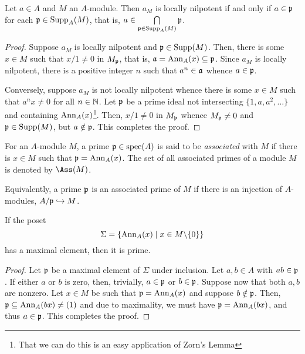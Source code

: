 \begin{proposition}
    Let $a\in A$ and $M$ an $A$-module. Then $a_M$ is locally nilpotent if and only if $a\in\mathfrak p$ for each $\mathfrak p\in\operatorname{Supp}_A(M)$, that is, $a\in\bigcap\limits_{\mathfrak p\in\operatorname{Supp}_A(M)}\mathfrak p$.
\end{proposition}
\begin{proof}
    Suppose $a_M$ is locally nilpotent and $\mathfrak p\in\operatorname{Supp}(M)$. Then, there is some $x\in M$ such that $x/1\ne 0$ in $M_\mathfrak p$, that is, $\mathfrak a = \operatorname{Ann}_A(x)\subseteq\mathfrak p$. Since $a_M$ is locally nilpotent, there is a positive integer $n$ such that $a^n\in\mathfrak a$ whence $a\in\mathfrak p$. 

    Conversely, suppose $a_M$ is not locally nilpotent whence there is some $x\in M$ such that $a^nx\ne0$ for all $n\in\mathbb{N}$. Let $\mathfrak p$ be a prime ideal not intersecting $\{1,a,a^2,\dots\}$ and containing $\operatorname{Ann}_A(x)$\footnote{That we can do this is an easy application of Zorn's Lemma}. Then, $x/1\ne 0$ in $M_\mathfrak p$ whence $M_\mathfrak p\ne 0$ and $\mathfrak p\in\operatorname{Supp}(M)$, but $a\notin\mathfrak p$. This completes the proof.
\end{proof}

\begin{definition}
    For an $A$-module $M$, a prime $\mathfrak p\in\operatorname{spec}(A)$ is said to be \emph{associated} with $M$ if there is $x\in M$ such that $\mathfrak p = \operatorname{Ann}_A(x)$. The set of all associated primes of a module $M$ is denoted by $\Ass(M)$.

    Equivalently, a prime $\mathfrak p$ is an associated prime of $M$ if there is an injection of $A$-modules, $A/\mathfrak p\hookrightarrow M$.
\end{definition}

\begin{proposition}
    If the poset 
    \begin{equation*}
        \Sigma = \{\operatorname{Ann}_A(x)\mid x\in M\backslash\{0\}\}
    \end{equation*}
    has a maximal element, then it is prime.
\end{proposition}
\begin{proof}
    Let $\mathfrak p$ be a maximal element of $\Sigma$ under inclusion. Let $a,b\in A$ with $ab\in\mathfrak p$. If either $a$ or $b$ is zero, then, trivially, $a\in\mathfrak p$ or $b\in\mathfrak p$. Suppose now that both $a,b$ are nonzero. Let $x\in M$ be such that $\mathfrak p = \operatorname{Ann}_A(x)$ and suppose $b\notin\mathfrak p$. Then, $\mathfrak p\subseteq\operatorname{Ann}_A(bx)\ne(1)$ and due to maximality, we must have $\mathfrak p = \operatorname{Ann}_A(bx)$, and thus $a\in\mathfrak p$. This completes the proof.
\end{proof}

